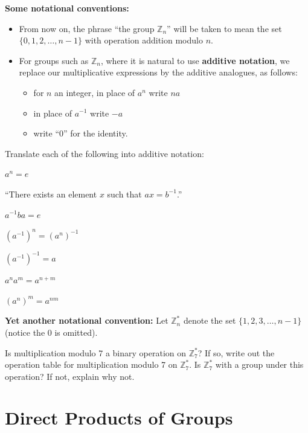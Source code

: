\textbf{Some notational conventions:}
\begin{itemize}[itemsep=0pt, topsep=3pt]
  \item From now on, the phrase ``the group \(\mathbb{Z}_n\)'' will be taken to mean the set \(\{0, 1, 2, \ldots, n - 1\}\) with operation addition modulo \(n\).
  \item For groups such as \(\mathbb{Z}_n\), where it is natural to use \textbf{additive notation}, we replace our multiplicative expressions by the additive analogues, as follows:
  \begin{itemize}[itemsep=0pt, topsep=3pt]
    \item for \(n\) an integer, in place of \(a^n\) write \(na\)
    \item in place of \(a^{-1}\) write \(-a\)
    \item write ``\(0\)'' for the identity.
  \end{itemize}
\end{itemize}

\begin{problem}
Translate each of the following into additive notation:
\begin{problemparts}
  \item \(a^n = e\)
  \item ``There exists an element \(x\) such that \(ax = b^{-1}\).''
  \item \(a^{-1}ba = e\)
  \item \((a^{-1})^n = (a^n)^{-1} \)
  \item \((a^{-1})^{-1} = a \)
  \item \(a^n a^m = a^{n+m}\)
  \item \((a^n)^m = a^{nm}\)
\end{problemparts}
\end{problem}

\textbf{Yet another notational convention:} Let \(\mathbb{Z}_n^*\) denote the set \(\{1, 2, 3, \ldots, n-1\}\) (notice the 0 is omitted).

\begin{problem}
Is multiplication modulo 7 a binary operation on \(\mathbb{Z}_7^*\)? If so, write out the operation table for multiplication modulo 7 on \(\mathbb{Z}_7^*\). Is \(\mathbb{Z}_7^*\) with a group under this operation? If not, explain why not.
\end{problem}

\section{Direct Products of Groups}

